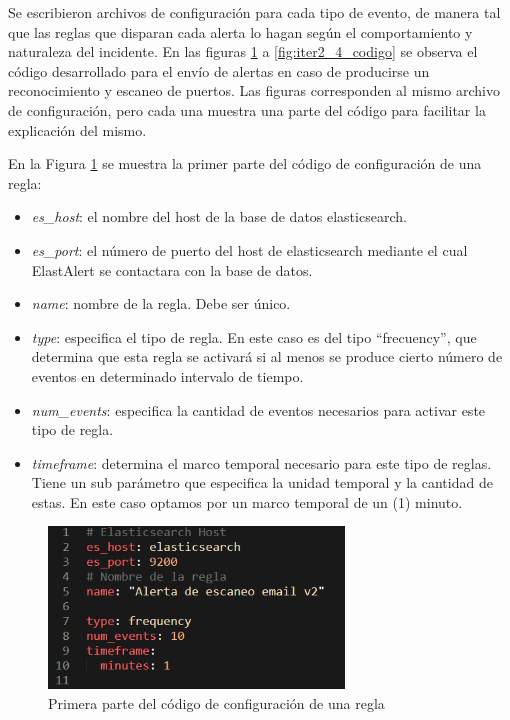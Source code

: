 Se escribieron archivos de configuración para cada tipo de evento, de manera tal que las reglas que disparan cada alerta lo hagan según el comportamiento y naturaleza del incidente. En las figuras \ref{fig:iter2_1_codigo} a \ref{fig:iter2_4_codigo} se observa el código desarrollado para el envío de alertas en caso de producirse un reconocimiento y escaneo de puertos. Las figuras corresponden al mismo archivo de configuración, pero cada una muestra una parte del código para facilitar la explicación del mismo.\par
    En la Figura \ref{fig:iter2_1_codigo} se muestra la primer parte del código de configuración de una regla:
    \begin{itemize}
        \item \textit{es\_host}: el nombre del host de la base de datos elasticsearch.
        \item \textit{es\_port}: el número de puerto del host de elasticsearch mediante el cual ElastAlert se contactara con la base de datos.
        \item \textit{name}: nombre de la regla. Debe ser único.
        \item \textit{type}: especifica el tipo de regla. En este caso es del tipo “frecuency”, que determina que esta regla se activará si al menos se produce cierto número de eventos en determinado intervalo de tiempo.
        \item \textit{num\_events}: especifica la cantidad de eventos necesarios para activar este tipo de regla.
        \item \textit{timeframe}: determina el marco temporal necesario para este tipo de reglas. Tiene un sub parámetro que especifica la unidad temporal y la cantidad de estas. En este caso optamos por un marco temporal de un (1) minuto.
    \end{itemize}
    \begin{figure}[H]
    \centering
        \includegraphics[width=0.7\textwidth]{./iteracion_2_imagenes/3-codigoAlerta-1.png}
        \caption{Primera parte del código de configuración de una regla}
        \label{fig:iter2_1_codigo}
    \end{figure}
